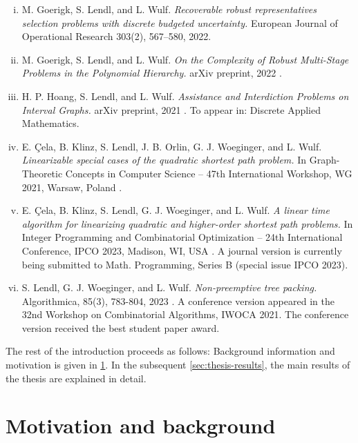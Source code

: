 \begin{enumerate}[(i)]
\item M. Goerigk, S. Lendl, and L. Wulf. \textit{Recoverable robust representatives selection problems with discrete budgeted uncertainty.} European Journal of Operational Research 303(2), 567--580, 2022. \cite{goerigk2022recoverable}

\item M. Goerigk, S. Lendl, and L. Wulf. \textit{On the Complexity of Robust Multi-Stage Problems in the Polynomial Hierarchy.} arXiv preprint, 2022 \cite{goerigk2022complexity}.

\item H. P. Hoang, S. Lendl, and L. Wulf.  \textit{Assistance and Interdiction Problems on Interval Graphs.} arXiv preprint, 2021 \cite{hoang2021assistance}. To appear in: Discrete Applied Mathematics.

\item E. Çela, B. Klinz, S. Lendl, J. B. Orlin, G. J. Woeginger, and L. Wulf. \textit{Linearizable
special cases of the quadratic shortest path problem.} In Graph-Theoretic Concepts in Computer Science -- 47th
International Workshop, WG 2021, Warsaw, Poland \cite{cela2021linearizable}.

\item E. Çela, B. Klinz, S. Lendl, G. J. Woeginger, and L. Wulf. \textit{A linear time algorithm
for linearizing quadratic and higher-order shortest path problems.} In Integer Programming and Combinatorial Optimization -- 24th
International Conference, IPCO 2023, Madison, WI, USA \cite{cela2023linear}. A journal version is currently being submitted to Math. Programming, Series B (special issue IPCO 2023).

\item S. Lendl, G. J. Woeginger, and L. Wulf. \textit{Non-preemptive tree packing.} Algorithmica, 85(3), 783-804, 2023 \cite{lendl2023nonpreemptive}. A conference version appeared in the 32nd Workshop on Combinatorial Algorithms, IWOCA 2021. The conference version received the best student paper award.
 \end{enumerate}

The rest of the introduction proceeds as follows: Background information and motivation is given in \cref{sec:motivation-background}. In the subsequent  \cref{sec:thesis-results}, the main results of the thesis are explained in detail.

\section{Motivation and background}
\label{sec:motivation-background}

